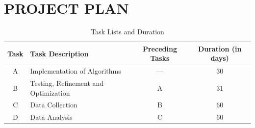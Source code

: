 \documentclass{strrespaper-trad}
\begin{document}
	\section{PROJECT PLAN}
		\begin{table}[htbp]
			\centering
			\caption{Task Lists and Duration}
			\label{tab:task_lists_duration}
			\begin{tabularx}{\linewidth}{cXcc}
				\toprule
				Task & Task Description                     & Preceding Tasks & Duration (in days) \\
				\midrule
				A    & Implementation of Algorithms         & ---             & 30                 \\
				B    & Testing, Refinement and Optimization & A               & 31                 \\
				C    & Data Collection                      & B               & 60                 \\
				D    & Data Analysis                        & C               & 60                 \\
				\bottomrule
			\end{tabularx}
		\end{table}
\end{document}
